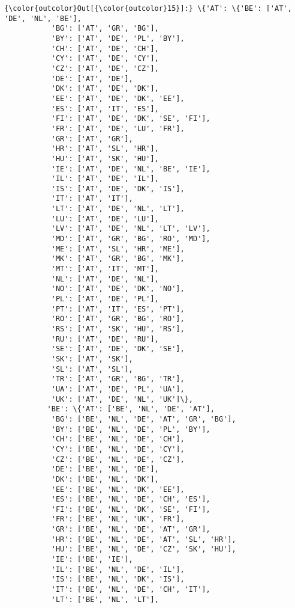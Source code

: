 \documentclass[11pt]{article}
\begin{document}
\begin{Verbatim}[commandchars=\\\{\}]
{\color{outcolor}Out[{\color{outcolor}15}]:} \{'AT': \{'BE': ['AT', 'DE', 'NL', 'BE'],
           'BG': ['AT', 'GR', 'BG'],
           'BY': ['AT', 'DE', 'PL', 'BY'],
           'CH': ['AT', 'DE', 'CH'],
           'CY': ['AT', 'DE', 'CY'],
           'CZ': ['AT', 'DE', 'CZ'],
           'DE': ['AT', 'DE'],
           'DK': ['AT', 'DE', 'DK'],
           'EE': ['AT', 'DE', 'DK', 'EE'],
           'ES': ['AT', 'IT', 'ES'],
           'FI': ['AT', 'DE', 'DK', 'SE', 'FI'],
           'FR': ['AT', 'DE', 'LU', 'FR'],
           'GR': ['AT', 'GR'],
           'HR': ['AT', 'SL', 'HR'],
           'HU': ['AT', 'SK', 'HU'],
           'IE': ['AT', 'DE', 'NL', 'BE', 'IE'],
           'IL': ['AT', 'DE', 'IL'],
           'IS': ['AT', 'DE', 'DK', 'IS'],
           'IT': ['AT', 'IT'],
           'LT': ['AT', 'DE', 'NL', 'LT'],
           'LU': ['AT', 'DE', 'LU'],
           'LV': ['AT', 'DE', 'NL', 'LT', 'LV'],
           'MD': ['AT', 'GR', 'BG', 'RO', 'MD'],
           'ME': ['AT', 'SL', 'HR', 'ME'],
           'MK': ['AT', 'GR', 'BG', 'MK'],
           'MT': ['AT', 'IT', 'MT'],
           'NL': ['AT', 'DE', 'NL'],
           'NO': ['AT', 'DE', 'DK', 'NO'],
           'PL': ['AT', 'DE', 'PL'],
           'PT': ['AT', 'IT', 'ES', 'PT'],
           'RO': ['AT', 'GR', 'BG', 'RO'],
           'RS': ['AT', 'SK', 'HU', 'RS'],
           'RU': ['AT', 'DE', 'RU'],
           'SE': ['AT', 'DE', 'DK', 'SE'],
           'SK': ['AT', 'SK'],
           'SL': ['AT', 'SL'],
           'TR': ['AT', 'GR', 'BG', 'TR'],
           'UA': ['AT', 'DE', 'PL', 'UA'],
           'UK': ['AT', 'DE', 'NL', 'UK']\},
          'BE': \{'AT': ['BE', 'NL', 'DE', 'AT'],
           'BG': ['BE', 'NL', 'DE', 'AT', 'GR', 'BG'],
           'BY': ['BE', 'NL', 'DE', 'PL', 'BY'],
           'CH': ['BE', 'NL', 'DE', 'CH'],
           'CY': ['BE', 'NL', 'DE', 'CY'],
           'CZ': ['BE', 'NL', 'DE', 'CZ'],
           'DE': ['BE', 'NL', 'DE'],
           'DK': ['BE', 'NL', 'DK'],
           'EE': ['BE', 'NL', 'DK', 'EE'],
           'ES': ['BE', 'NL', 'DE', 'CH', 'ES'],
           'FI': ['BE', 'NL', 'DK', 'SE', 'FI'],
           'FR': ['BE', 'NL', 'UK', 'FR'],
           'GR': ['BE', 'NL', 'DE', 'AT', 'GR'],
           'HR': ['BE', 'NL', 'DE', 'AT', 'SL', 'HR'],
           'HU': ['BE', 'NL', 'DE', 'CZ', 'SK', 'HU'],
           'IE': ['BE', 'IE'],
           'IL': ['BE', 'NL', 'DE', 'IL'],
           'IS': ['BE', 'NL', 'DK', 'IS'],
           'IT': ['BE', 'NL', 'DE', 'CH', 'IT'],
           'LT': ['BE', 'NL', 'LT'],

\end{Verbatim}
\end{document}
